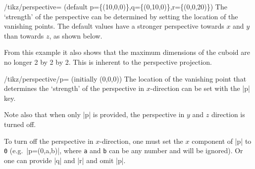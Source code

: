 \begin{key}{/tikz/perspective=
    (default p=\{(10,0,0)\},q=\{(0,10,0)\},r=\{(0,0,20)\})}
  The `strength' of the perspective can be determined by setting the location of
  the vanishing points. The default values have a stronger perspective towards
  $x$ and $y$ than towards $z$, as shown below.
\begin{codeexample}[preamble={\usetikzlibrary{perspective}}]
\end{codeexample}
%
  From this example it also shows that the maximum dimensions of the cuboid are
  no longer 2 by 2 by 2. This is inherent to the perspective projection.
  \begin{key}{/tikz/perspective/p= (initially (0,0,0))}
    The location of the vanishing point that determines the `strength' of the
    perspective in $x$-direction can be set with the |p| key.
\begin{codeexample}[preamble={\usetikzlibrary{perspective}}]
\end{codeexample}
    Note also that when only |p| is provided, the perspective in $y$ and $z$
    direction is turned off.

    To turn off the perspective in $x$-direction, one must set the $x$ component
    of |p| to \texttt{0} (e.g.\ |p={(0,a,b)}|, where \texttt{a} and \texttt{b}
    can be any number and will be ignored). Or one can provide |q| and |r| and
    omit |p|.


\end{key}
\end{key}
